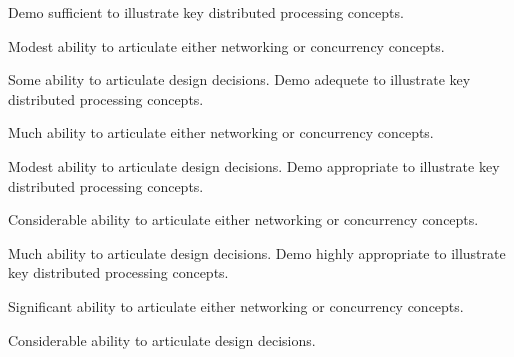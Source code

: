 \documentclass{../../fal_assignment}
\begin{document}
\begin{markingrubric}
        \grade Demo sufficient to illustrate key distributed processing concepts.
            \par Modest ability to articulate either networking or concurrency concepts.
            \par Some ability to articulate design decisions.
        \grade Demo adequete to illustrate key distributed processing concepts.
            \par Much ability to articulate either networking or concurrency concepts.
            \par Modest ability to articulate design decisions.
        \grade Demo appropriate to illustrate key distributed processing concepts.
            \par Considerable ability to articulate either networking or concurrency concepts.
            \par Much ability to articulate design decisions.
        \grade Demo highly appropriate to illustrate key distributed processing concepts.
            \par Significant ability to articulate either networking or concurrency concepts.
            \par Considerable ability to articulate design decisions.
\end{markingrubric}
\end{document}
